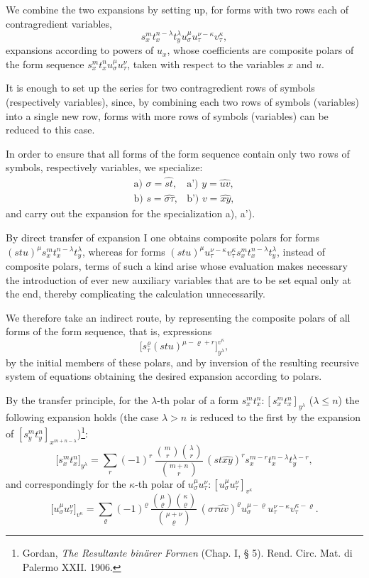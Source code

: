 \documentclass[11pt]{article}
\begin{document}
We combine the two expansions by setting up, for forms with two rows each of contragredient variables,
\[
s_x^m t_x^{n-\lambda}t_y^\lambda  u_\sigma^\mu u_\tau^{\nu-\kappa}v_\tau^\kappa,
\]
expansions according to powers of $u_x$, whose coefficients are composite polars of the form sequence $s_x^m t_x^n u_\sigma^\mu u_\tau^\nu$, taken with respect to the variables $x$ and $u$.

It is enough to set up the series for two contragredient rows of symbols (respectively variables), since, by combining each two rows of symbols (variables) into a single new row, forms with more rows of symbols (variables) can be reduced to this case.

In order to ensure that all forms of the form sequence contain only two rows of symbols, respectively variables, we specialize:
\[
\begin{array}{ll}
\text{a) } \sigma=\widehat{st}, & \text{a') } y=\widehat{uv},\\[0.3em]
\text{b) } s=\widehat{\sigma\tau}, & \text{b') } v=\widehat{xy},
\end{array}
\]
and carry out the expansion for the specialization a), a').

By direct transfer of expansion I one obtains composite polars for forms $(stu)^\mu s_x^m t_x^{n-\lambda}t_y^\lambda$, whereas for forms $(stu)^\mu u_\tau^{\nu-\kappa}v_\tau^\kappa s_x^m t_x^{n-\lambda}t_y^\lambda$, instead of composite polars, terms of such a kind arise whose evaluation makes necessary the introduction of ever new auxiliary variables that are to be set equal only at the end, thereby complicating the calculation unnecessarily.

We therefore take an indirect route, by representing the composite polars of all forms of the form sequence, that is, expressions
\[
\bigl[s_\tau^\varrho(stu)^{\mu-\varrho+r}\bigr]_{y^\lambda}^{v^\kappa},
\]
by the initial members of these polars, and by inversion of the resulting recursive system of equations obtaining the desired expansion according to polars.

By the transfer principle, for the $\lambda$-th polar of a form $s_x^m t_x^n:[s_x^m t_x^n]_{y^\lambda}$ ($\lambda\le n$) the following expansion holds (the case $\lambda>n$ is reduced to the first by the expansion of $[s_y^m t_y^n]_{x^{m+n-\lambda}}$)\footnote{Gordan, \emph{The Resultante binärer Formen} (Chap. I, § 5). Rend. Circ. Mat. di Palermo XXII. 1906.}:
\[
\bigl[s_x^m t_x^n\bigr]_{y^\lambda}
=\sum_r (-1)^r\,
\frac{\binom{m}{r}\binom{\lambda}{r}}{\binom{m+n}{r}}\,
(st\widehat{xy})^r s_x^{m-r}t_x^{n-\lambda}t_y^{\lambda-r},
\]
and correspondingly for the $\kappa$-th polar of $u_\sigma^\mu u_\tau^\nu:[u_\sigma^\mu u_\tau^\nu]_{v^\kappa}$
\[
\bigl[u_\sigma^\mu u_\tau^\nu\bigr]_{v^\kappa}
=\sum_\varrho (-1)^\varrho\,
\frac{\binom{\mu}{\varrho}\binom{\kappa}{\varrho}}{\binom{\mu+\nu}{\varrho}}\,
(\sigma\tau\widehat{uv})^\varrho u_\sigma^{\mu-\varrho}u_\tau^{\nu-\kappa}v_\tau^{\kappa-\varrho}.
\]
\end{document}
